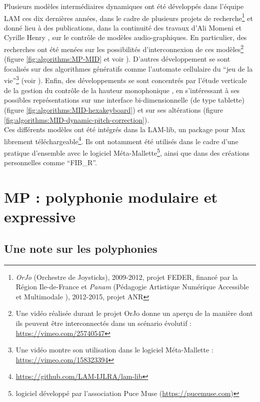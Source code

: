 \noindent Plusieurs modèles intermédiaires dynamiques ont été développés dans l'équipe \gls{LAM} ces dix dernières années, dans le cadre de plusieurs projets de recherche\footnote{\textit{OrJo} (Orchestre de Joysticks), 2009-2012, projet FEDER, financé par la Région Ile-de-France et \textit{Panam} (Pédagogie Artistique Numérique Accessible et Multimodale ), 2012-2015, projet \gls{ANR}} et donné lieu à des publications, dans la continuité des travaux d'Ali Momeni et Cyrille Henry \cite{momeni_dynamic_2006}, sur le contrôle de modèles audio-graphiques. En particulier, des recherches ont été menées sur les possibilités d'interconnexion de ces modèles\footnote{Une vidéo réalisée durant le projet OrJo donne un aperçu de la manière dont ils peuvent être interconnectés dans un scénario évolutif : \url{https://vimeo.com/25740547}} (figure \ref{fig:algorithms:MP-MID} et voir \cite{goudard_dynamic_2011}). D'autres développement se sont focalisés sur des algorithmes génératifs comme l'automate cellulaire du ``jeu de la vie''\footnote{Une vidéo montre son utilisation dans le logiciel Méta-Mallette : \url{https://vimeo.com/158323394}} (voir \cite{goudard_modeintermediaire_2012}). Enfin, des développements se sont concentrés par l'étude verticale de la gestion du contrôle de la hauteur monophonique \cite{goudard_playing_2014}, en s'intéressant à ses possibles représentations sur une interface bi-dimensionnelle (de type tablette)(figure \ref{fig:algorithms:MID-hexakeyboard}) et sur ses altérations (figure \ref{fig:algorithms:MID-dynamic-pitch-correction}).\\
\indent Ces différents modèles ont été intégrés dans la LAM-lib, un package pour Max librement téléchargeable\footnote{\url{https://github.com/LAM-IJLRA/lam-lib}}. Ils ont notamment été utilisés dans le cadre d'une pratique d'ensemble avec le logiciel Méta-Mallette\footnote{logiciel développé par l'association Puce Muse (\url{https://pucemuse.com})}, ainsi que dans des créations personnelles comme ``FIB\_R''.


\section{MP : polyphonie modulaire et expressive}
\label{sec:algorithms:MP}
\subsection{Une note sur les polyphonies}

